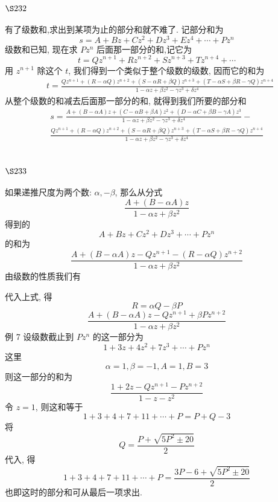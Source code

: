 \section{$\S 232$}

有了级数和,求出到某项为止的部分和就不难了. 记部分和为
\[
s=A+B z+C z^{2}+D z^{3}+E z^{4}+\cdots+P z^{n}
\]
级数和已知, 现在求 $P z^{n}$ 后面那一部分的和,记它为
\[
t=Q z^{n+1}+R z^{n+2}+S z^{n+3}+T z^{n+4}+\cdots
\]
用 $z^{n+1}$ 除这个 $t$, 我们得到一个类似于整个级数的级数, 因而它的和为 
\[
\begin{aligned}
& t=\frac{Q z^{n+1}+(R-\alpha Q) z^{n+2}+(S-\alpha R+\beta Q) z^{n+3}+(T-\alpha S+\beta R-\gamma Q) z^{n+4}}{1-\alpha z+\beta z^{2}-\gamma z^{3}+\delta z^{4}}
\end{aligned}
\]
从整个级数的和减去后面那一部分的和, 就得到我们所要的部分和
\[
\begin{gathered}
s=\frac{A+(B-\alpha A) z+(C-\alpha B+\beta A) z^{2}+(D-\alpha C+\beta B-\gamma A) z^{3}}{1-\alpha z+\beta z^{2}-\gamma z^{3}+\delta z^{4}}- \\
\frac{Q z^{n+1}+(R-\alpha Q) z^{n+2}+(S-\alpha R+\beta Q) z^{n+3}+(T-\alpha S+\beta R-\gamma Q) z^{n+4}}{1-\alpha z+\beta z^{2}-\gamma z^{3}+\delta z^{4}}
\end{gathered}
\]
\section{$\S 233$}

如果递推尺度为两个数: $\alpha,-\beta$, 那么从分式
\[
\frac{A+(B-\alpha A) z}{1-\alpha z+\beta z^{2}}
\]
得到的
\[
A+B z+C z^{2}+D z^{3}+\cdots+P z^{n}
\]
的和为
\[
\frac{A+(B-\alpha A) z-Q z^{n+1}-(R-\alpha Q) z^{n+2}}{1-\alpha z+\beta z^{2}}
\]
由级数的性质我们有

代入上式, 得
\[
R=\alpha Q-\beta P
\]
\[
\frac{A+(B-\alpha A) z-Q z^{n+1}+\beta P z^{n+2}}{1-\alpha z+\beta z^{2}}
\]
例 7 设级数截止到 $P z^{n}$ 的这一部分为
\[
1+3 z+4 z^{2}+7 z^{3}+\cdots+P z^{n}
\]
这里
\[
\alpha=1, \beta=-1, A=1, B=3
\]
则这一部分的和为
\[
\frac{1+2 z-Q z^{n+1}-P z^{n+2}}{1-z-z^{2}}
\]
令 $z=1$, 则这和等于
\[
1+3+4+7+11+\cdots+P=P+Q-3
\]
将
\[
Q=\frac{P+\sqrt{5 P^{2} \pm 20}}{2}
\]
代入, 得
\[
1+3+4+7+11+\cdots+P=\frac{3 P-6+\sqrt{5 P^{2} \pm 20}}{2}
\]
也即这时的部分和可从最后一项求出. 

